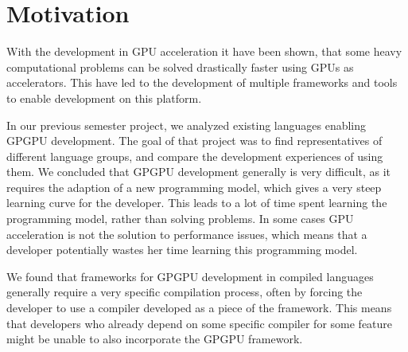 \section{Motivation}\label{cha:motivation}
With the development in GPU acceleration it have been shown, that some heavy computational problems can be solved drastically faster using GPUs as accelerators. This have led to the development of multiple frameworks and tools to enable development on this platform.

In our previous semester project\cite{sw9Report}, we analyzed existing languages enabling GPGPU development. The goal of that project was to find representatives of different language groups, and compare the development experiences of using them. We concluded that GPGPU development generally is very difficult, as it requires the adaption of a new programming model, which gives a very steep learning curve for the developer. This leads to a lot of time spent learning the programming model, rather than solving problems. In some cases GPU acceleration is not the solution to performance issues, which means that a developer potentially wastes her time learning this programming model.

We found that frameworks for GPGPU development in compiled languages generally require a very specific compilation process, often by forcing the developer to use a compiler developed as a piece of the framework. This means that developers who already depend on some specific compiler for some feature might be unable to also incorporate the GPGPU framework.





